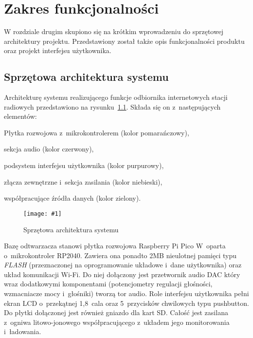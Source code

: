 \documentclass[polish]{aghengthesis}
\let\tempone\itemize
\let\temptwo\enditemize
\renewenvironment{itemize}{\tempone\setlength{\itemsep}{0cm}}{\temptwo}
\newcommand{\imgint}[4]{
	\begin{figure}[{#4}]
		\centering
		\texttt{[image: \#1]}
		\caption{#2}
		\label{#1}
	\end{figure}
}
\newcommand{\imgh}[3]{\imgint{#1}{#2}{#3}{H}}
\begin{document}
\chapter{Zakres funkcjonalności}
	W rozdziale drugim skupiono się na krótkim wprowadzeniu do sprzętowej architektury projektu. Przedstawiony został także opis funkcjonalności produktu oraz projekt interfejsu użytkownika.\\
	
	\section{Sprzętowa architektura systemu}
			Architekturę systemu realizującego funkcje odbiornika internetowych stacji radiowych przedstawiono na rysunku~\ref{2/PicoRadio-hw-blocks}. Składa się on z~następujących elementów:
			\begin{itemize}
				\item Płytka rozwojowa z~mikrokontrolerem (kolor \textcolor{io-fg-orange}{pomarańczowy}),
				\item sekcja audio (kolor \textcolor{io-fg-red}{czerwony}),
				\item podsystem interfejsu użytkownika (kolor \textcolor{io-fg-purple}{purpurowy}),
				\item złącza zewnętrzne i~sekcja zasilania (kolor \textcolor{io-fg-blue}{niebieski}),
				\item współpracujące źródła danych (kolor \textcolor{io-fg-green}{zielony}).
			\end{itemize}
			
			\imgh{2/PicoRadio-hw-blocks}{Sprzętowa architektura systemu}{0.95}
			
			\pagebreak
			Bazę odtwarzacza stanowi płytka rozwojowa Raspberry Pi Pico W~oparta o~mikrokontroler RP2040. Zawiera ona ponadto 2MB nieulotnej pamięci typu \textit{FLASH} (przeznaczonej na oprogramowanie układowe i~dane użytkownika) oraz układ komunikacji Wi-Fi. Do niej dołączony jest przetwornik audio DAC który wraz dodatkowymi komponentami (potencjometry regulacji głośności, wzmacniacze mocy i~głośniki) tworzą tor audio. Role interfejsu użytkownika pełni ekran LCD o~przekątnej 1,8~cala oraz 5~przycisków chwilowych typu pushbutton. Do płytki  dołączonej jest również gniazdo dla kart SD. Całość jest zasilana z~ogniwa litowo-jonowego współpracującego z~układem jego monitorowania i~ładowania. 
			$ $\\
			
\end{document}
